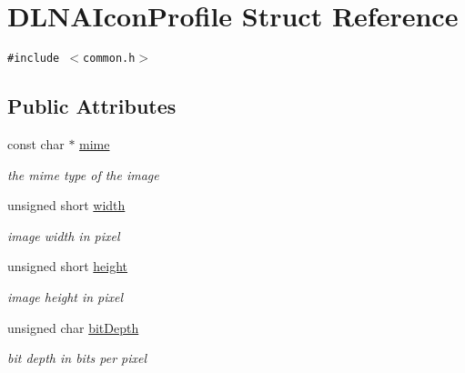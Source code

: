 \hypertarget{structDLNAIconProfile}{
\section{DLNAIconProfile Struct Reference}
\label{structDLNAIconProfile}
}
{\tt \#include $<$common.h$>$}

\subsection*{Public Attributes}
\begin{CompactItemize}
\item 
\hypertarget{structDLNAIconProfile_d5dc566526b37cddf1cfd14fa1efa509}{
const char $\ast$ \hyperlink{structDLNAIconProfile_d5dc566526b37cddf1cfd14fa1efa509}{mime}}
\label{structDLNAIconProfile_d5dc566526b37cddf1cfd14fa1efa509}

\begin{CompactList}\small\item\em the mime type of the image \item\end{CompactList}\item 
\hypertarget{structDLNAIconProfile_b570aed93a91d6629a5f14ac28bb474d}{
unsigned short \hyperlink{structDLNAIconProfile_b570aed93a91d6629a5f14ac28bb474d}{width}}
\label{structDLNAIconProfile_b570aed93a91d6629a5f14ac28bb474d}

\begin{CompactList}\small\item\em image width in pixel \item\end{CompactList}\item 
\hypertarget{structDLNAIconProfile_80d7178a6681bef071a5c8e3598e54fb}{
unsigned short \hyperlink{structDLNAIconProfile_80d7178a6681bef071a5c8e3598e54fb}{height}}
\label{structDLNAIconProfile_80d7178a6681bef071a5c8e3598e54fb}

\begin{CompactList}\small\item\em image height in pixel \item\end{CompactList}\item 
\hypertarget{structDLNAIconProfile_7c3a12a0f4673cd6d9b49895326b99c3}{
unsigned char \hyperlink{structDLNAIconProfile_7c3a12a0f4673cd6d9b49895326b99c3}{bitDepth}}
\label{structDLNAIconProfile_7c3a12a0f4673cd6d9b49895326b99c3}

\begin{CompactList}\small\item\em bit depth in bits per pixel \item\end{CompactList}\end{CompactItemize}


